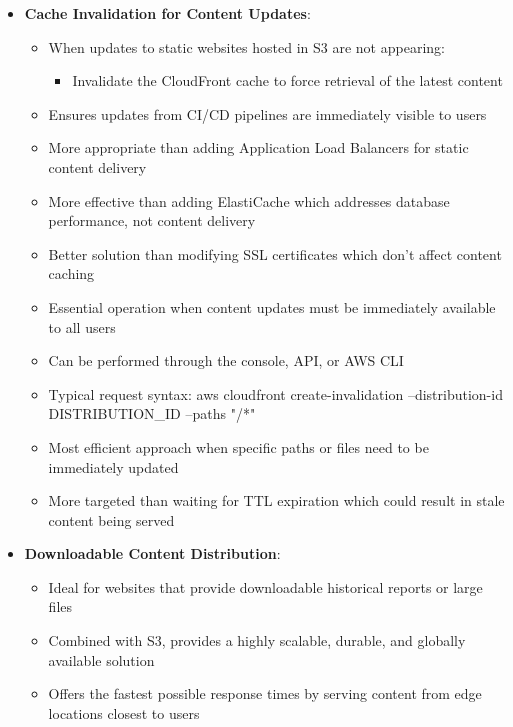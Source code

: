 \documentclass[11pt,a4paper]{report}
\begin{document}
\begin{itemize}
\begin{itemize}
  \item More suitable than ElastiCache, WAF, or multi-region ALB deployments for static content delivery
  \item Provides global content distribution with minimal operational overhead and infrastructure costs
\end{itemize}
  \item \textbf{Cache Invalidation for Content Updates}:
\begin{itemize}
  \item When updates to static websites hosted in S3 are not appearing:
\begin{itemize}
  \item Invalidate the CloudFront cache to force retrieval of the latest content
\end{itemize}
  \item Ensures updates from CI/CD pipelines are immediately visible to users
  \item More appropriate than adding Application Load Balancers for static content delivery
  \item More effective than adding ElastiCache which addresses database performance, not content delivery
  \item Better solution than modifying SSL certificates which don't affect content caching
  \item Essential operation when content updates must be immediately available to all users
  \item Can be performed through the console, API, or AWS CLI
  \item Typical request syntax: aws cloudfront create-invalidation --distribution-id DISTRIBUTION\_ID --paths "/*"
  \item Most efficient approach when specific paths or files need to be immediately updated
  \item More targeted than waiting for TTL expiration which could result in stale content being served
\end{itemize}
  \item \textbf{Downloadable Content Distribution}:
\begin{itemize}
  \item Ideal for websites that provide downloadable historical reports or large files
  \item Combined with S3, provides a highly scalable, durable, and globally available solution
  \item Offers the fastest possible response times by serving content from edge locations closest to users

\end{itemize}
\end{itemize}
\end{document}
